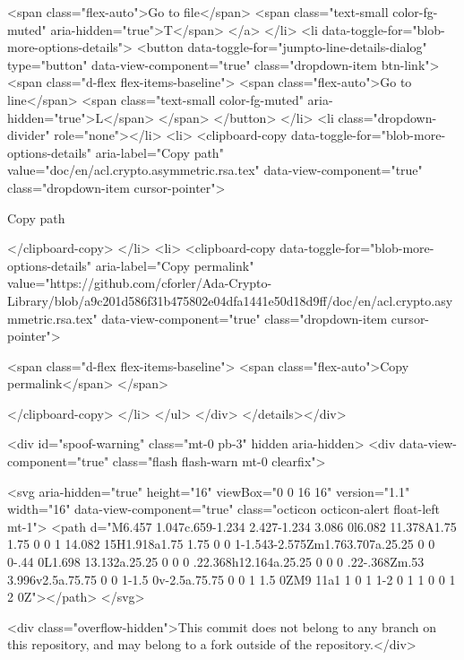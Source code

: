             <span class="flex-auto">Go to file</span>
            <span class="text-small color-fg-muted" aria-hidden="true">T</span>
</a>        </li>
        <li data-toggle-for="blob-more-options-details">
            <button data-toggle-for="jumpto-line-details-dialog" type="button" data-view-component="true" class="dropdown-item btn-link">    <span class="d-flex flex-items-baseline">
              <span class="flex-auto">Go to line</span>
              <span class="text-small color-fg-muted" aria-hidden="true">L</span>
            </span>
</button>        </li>
        <li class="dropdown-divider" role="none"></li>
        <li>
          <clipboard-copy data-toggle-for="blob-more-options-details" aria-label="Copy path" value="doc/en/acl.crypto.asymmetric.rsa.tex" data-view-component="true" class="dropdown-item cursor-pointer">
    
            Copy path

</clipboard-copy>        </li>
        <li>
          <clipboard-copy data-toggle-for="blob-more-options-details" aria-label="Copy permalink" value="https://github.com/cforler/Ada-Crypto-Library/blob/a9c201d586f31b475802e04dfa1441e50d18d9ff/doc/en/acl.crypto.asymmetric.rsa.tex" data-view-component="true" class="dropdown-item cursor-pointer">
    
            <span class="d-flex flex-items-baseline">
              <span class="flex-auto">Copy permalink</span>
            </span>

</clipboard-copy>        </li>
      </ul>
</div>
</details></div>





    <div id="spoof-warning" class="mt-0 pb-3" hidden aria-hidden>
  <div data-view-component="true" class="flash flash-warn mt-0 clearfix">
  
    <svg aria-hidden="true" height="16" viewBox="0 0 16 16" version="1.1" width="16" data-view-component="true" class="octicon octicon-alert float-left mt-1">
    <path d="M6.457 1.047c.659-1.234 2.427-1.234 3.086 0l6.082 11.378A1.75 1.75 0 0 1 14.082 15H1.918a1.75 1.75 0 0 1-1.543-2.575Zm1.763.707a.25.25 0 0 0-.44 0L1.698 13.132a.25.25 0 0 0 .22.368h12.164a.25.25 0 0 0 .22-.368Zm.53 3.996v2.5a.75.75 0 0 1-1.5 0v-2.5a.75.75 0 0 1 1.5 0ZM9 11a1 1 0 1 1-2 0 1 1 0 0 1 2 0Z"></path>
</svg>

      <div class="overflow-hidden">This commit does not belong to any branch on this repository, and may belong to a fork outside of the repository.</div>


